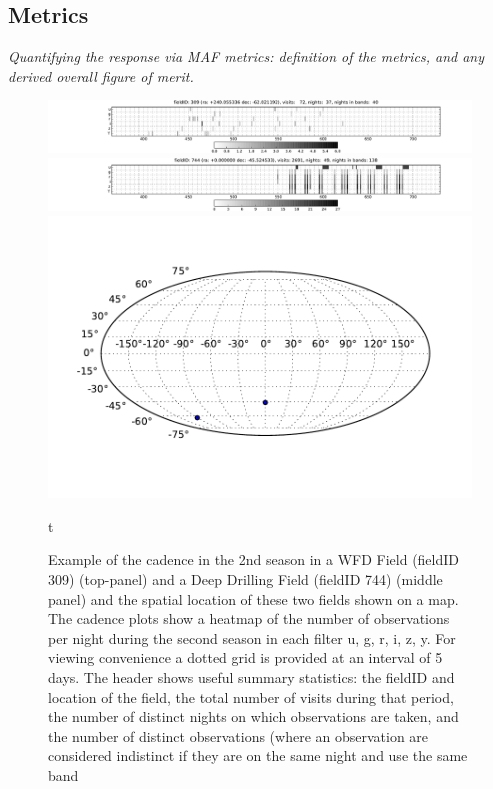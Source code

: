 






\subsection{Metrics}
\label{sec:\secname:metrics}

{\it Quantifying the response via MAF metrics: definition of the metrics,
and any derived overall figure of merit.}
\label{sec:\secname:metrics}
\begin{figure}
 \centering
 \includegraphics[width=\textwidth]{figs/supernova/fig_309_2ndYear}
 \includegraphics[width=\textwidth]{figs/supernova/fig_744_2ndYear}
 \includegraphics[height=0.2\textheight]{figs/supernova/loc_309_744.pdf}
 \label{fig:SN_sampling}
 \caption{Example of the cadence in the 2nd season in a WFD Field (fieldID 309) (top-panel) and a Deep Drilling Field (fieldID 744) (middle panel) and the
     spatial location of these two fields shown on a map. The cadence plots show a heatmap of the number of observations per night during the second season in each filter u, g, r, i, z, y. For viewing convenience a dotted grid is provided at an interval of 5 days. The header shows useful summary statistics:
 the fieldID and location of the field, the total number of visits during that period, the number of distinct nights on which observations are taken, and the number of distinct observations (where an observation are considered indistinct if they are on the same night and use the same band}
t
\end{figure}

